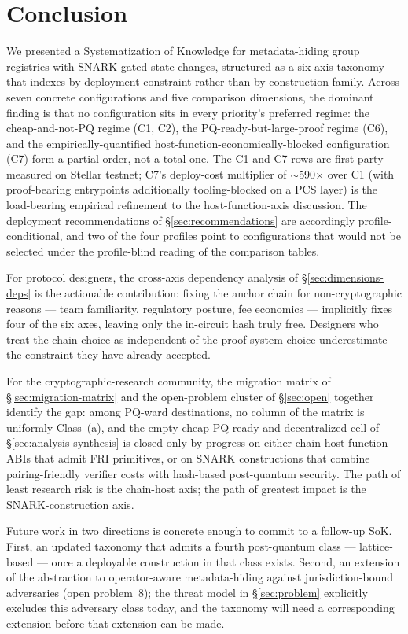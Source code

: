 \section{Conclusion}
\label{sec:conclusion}

We presented a Systematization of Knowledge for metadata-hiding group
registries with SNARK-gated state changes, structured as a six-axis
taxonomy that indexes by deployment constraint rather than by
construction family. Across seven concrete configurations and five
comparison dimensions, the dominant finding is that no configuration
sits in every priority's preferred regime: the cheap-and-not-PQ
regime (C1, C2), the PQ-ready-but-large-proof regime (C6), and the
empirically-quantified host-function-economically-blocked
configuration (C7) form a partial order, not a total one. The C1
and C7 rows are first-party measured on Stellar testnet; C7's
deploy-cost multiplier of $\sim$590$\times$ over C1 (with
proof-bearing entrypoints additionally tooling-blocked on a PCS
layer) is the load-bearing empirical refinement to the
host-function-axis discussion. The deployment recommendations of
\S\ref{sec:recommendations} are accordingly profile-conditional,
and two of the four profiles point to configurations that would not
be selected under the profile-blind reading of the comparison
tables.

For protocol designers, the cross-axis dependency analysis of
\S\ref{sec:dimensions-deps} is the actionable contribution:
fixing the anchor chain for non-cryptographic reasons --- team
familiarity, regulatory posture, fee economics --- implicitly fixes
four of the six axes, leaving only the in-circuit hash truly free.
Designers who treat the chain choice as independent of the
proof-system choice underestimate the constraint they have already
accepted.

For the cryptographic-research community, the migration matrix of
\S\ref{sec:migration-matrix} and the open-problem cluster of
\S\ref{sec:open} together identify the gap: among PQ-ward
destinations, no column of the matrix is uniformly Class~(a), and
the empty cheap-PQ-ready-and-decentralized cell of
\S\ref{sec:analysis-synthesis} is closed only by progress on either
chain-host-function ABIs that admit FRI primitives, or on
SNARK constructions that combine pairing-friendly verifier costs
with hash-based post-quantum security. The path of least research
risk is the chain-host axis; the path of greatest impact is the
SNARK-construction axis.

Future work in two directions is concrete enough to commit to a
follow-up SoK. First, an updated taxonomy that admits a fourth
post-quantum class --- lattice-based --- once a deployable
construction in that class exists. Second, an extension of the
abstraction to operator-aware metadata-hiding against
jurisdiction-bound adversaries (open problem~8); the threat model in
\S\ref{sec:problem} explicitly excludes this adversary class today,
and the taxonomy will need a corresponding extension before that
extension can be made.
